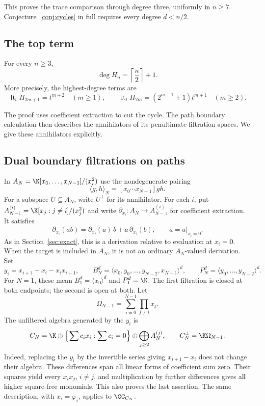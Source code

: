 This proves the trace comparison through degree three, uniformly in
$n\ge7$. Conjecture~\ref{conj:cycles} in full requires every degree $d<n/2$.

\subsection{The top term}
\label{sec:cycle-top}

\begin{theorem}\label{thm:cycle-top}
For every $n\ge3$,
\[
\deg H_n=\left\lceil\frac n2\right\rceil+1.
\]
More precisely, the highest-degree terms are
\begin{equation}\label{eq:cycle-top-terms}
\operatorname{lt}_tH_{2m+1}=t^{m+2}\quad(m\ge1),\qquad
\operatorname{lt}_tH_{2m}=(2^{m-1}+1)t^{m+1}\quad(m\ge2).
\end{equation}
\end{theorem}

The proof uses coefficient extraction to cut the cycle. The path
boundary calculation then describes the annihilators of its penultimate
filtration spaces. We give these annihilators explicitly.

\subsection{Dual boundary filtrations on paths}
\label{sec:dual-paths}

In $A_N=\K[x_0,\ldots,x_{N-1}]/(x_i^2)$ use the nondegenerate pairing
\begin{equation}\label{eq:coefficient-pairing}
\langle g,h\rangle_N=[x_0\cdots x_{N-1}]gh.
\end{equation}
For a subspace $U\subseteq A_N$, write $U^\perp$ for its annihilator.
For each $i$, put $A_{N-1}^{(i)}=\K[x_j:j\ne i]/(x_j^2)$ and
write $\partial_{x_i}:A_N\to A_{N-1}^{(i)}$ for coefficient extraction.
It satisfies
\[
 \partial_{x_i}(ab)=\partial_{x_i}(a)\,\bar b+
                  \bar a\,\partial_{x_i}(b),\qquad \bar a=a|_{x_i=0}.
\]
As in Section~\ref{sec:exact}, this is a derivation relative to
evaluation at $x_i=0$. When the target is included in $A_N$, it is not
an ordinary $A_N$-valued derivation. Set
\[
y_i=x_{i+1}-x_i-x_ix_{i+1},\qquad
B_N^d=\langle x_0,y_0,\ldots,y_{N-2},x_{N-1}\rangle^d,\qquad
P_N^d=\langle y_0,\ldots,y_{N-2}\rangle^d.
\]
For $N=1$, these mean $B_1^d=\langle x_0\rangle^d$ and $P_1^d=\K$.
The first filtration is closed at both endpoints; the second is open
at both. Let
\[
\Omega_{N-1}=\sum_{i=0}^{N-1}\prod_{j\ne i}x_j.
\]
The unfiltered algebra generated by the $y_i$ is
\begin{equation}\label{eq:open-path-algebra}
C_N=\K\oplus
\left\{\sum c_ix_i:\sum c_i=0\right\}
\oplus\bigoplus_{j\ge2}A_N^{(j)},
\qquad C_N^\perp=\K\Omega_{N-1}.
\end{equation}
Indeed, replacing the $y_i$ by the invertible series giving
$x_{i+1}-x_i$ does not change their algebra. These differences span all
linear forms of coefficient sum zero. Their squares yield every
$x_ix_j$, $i\ne j$, and multiplication by further differences gives all
higher square-free monomials. This also proves the last assertion.
The same description, with $x_i=\varphi_i$, applies to $\CC_{C_N}$.

